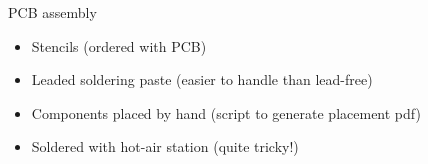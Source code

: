 \documentclass[compress,red]{beamer}
\begin{document}
\begin{frame}{PCB assembly}

  \begin{block}{}
    \begin{itemize}
    \item Stencils (ordered with PCB)
    \item Leaded soldering paste (easier to handle than lead-free)
    \item Components placed by hand (script to generate placement pdf)
    \item Soldered with hot-air station (quite tricky!)
    \end{itemize}
  \end{block}

  \begin{center}
  \end{center}

  \note[item]{}

\end{frame}
\end{document}
